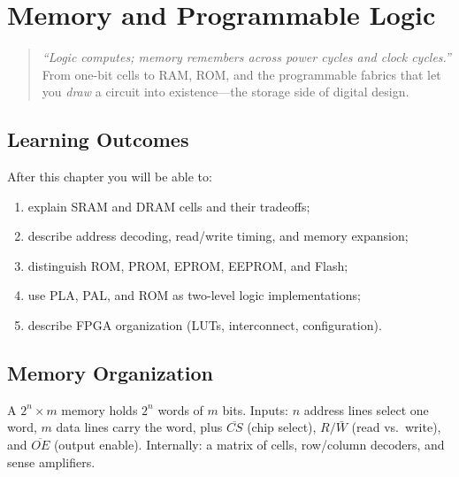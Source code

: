 \chapter{Memory and Programmable Logic}
\label{ch:memory}

\begin{quote}
\emph{``Logic computes; memory remembers across power cycles and clock cycles.''}
From one-bit cells to RAM, ROM, and the programmable fabrics that let you
\emph{draw} a circuit into existence---the storage side of digital design.
\end{quote}

\noindent{}
\vspace{0.4em}

\section*{Learning Outcomes}
After this chapter you will be able to:
\begin{enumerate}[label=(L\arabic*)]
    \item explain SRAM and DRAM cells and their tradeoffs;
    \item describe address decoding, read/write timing, and memory expansion;
    \item distinguish ROM, PROM, EPROM, EEPROM, and Flash;
    \item use PLA, PAL, and ROM as two-level logic implementations;
    \item describe FPGA organization (LUTs, interconnect, configuration).
\end{enumerate}

\section{Memory Organization}
\label{sec:memory-org}
A $2^n\times m$ memory holds $2^n$ words of $m$ bits. Inputs: $n$ address lines select one word,
$m$ data lines carry the word, plus $\overline{CS}$ (chip select), $R/\bar W$ (read vs.\ write),
and $\overline{OE}$ (output enable). Internally: a matrix of cells, row/column decoders, and sense amplifiers.

